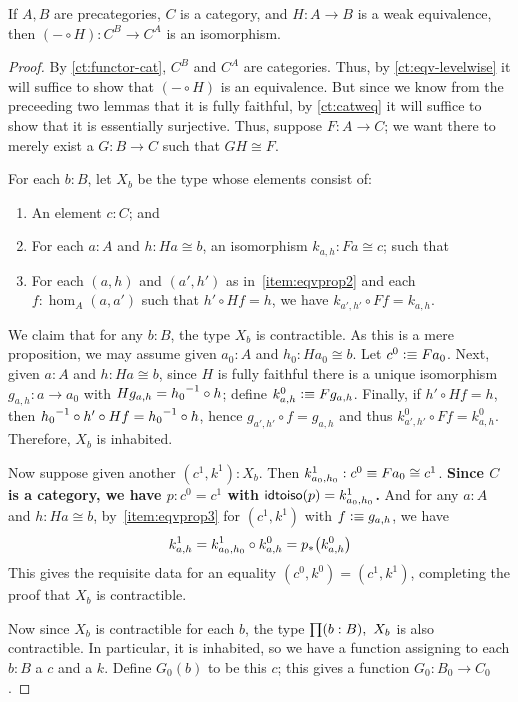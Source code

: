 \begin{thm}\label{ct:cat-weq-eq}
  If $A,B$ are precategories, $C$ is a category, and $H:A\to B$ is a weak equivalence, then $(-\circ H):C^B \to C^A$ is an isomorphism.
\end{thm}
\begin{proof}
  By \autoref{ct:functor-cat}, $C^B$ and $C^A$ are categories.
  Thus, by \autoref{ct:eqv-levelwise} it will suffice to show that $(-\circ H)$ is an equivalence.
  But since we know from the preceeding two lemmas that it is fully faithful, by \autoref{ct:catweq} it will suffice to show that it is essentially surjective.
  Thus, suppose $F:A\to C$; we want there to merely exist a $G:B\to C$ such that $GH\cong F$.

  For each $b:B$, let $X_b$ be the type whose elements consist of:
  \begin{enumerate}
  \item An element $c:C$; and
  \item For each $a:A$ and $h:Ha\cong b$, an isomorphism $k_{a,h}:Fa\cong c$; such that\label{item:eqvprop2}
  \item For each $(a,h)$ and $(a',h')$ as in~\ref{item:eqvprop2} and each $f:\hom_A(a,a')$ such that $h'\circ Hf = h$, we have $k_{a',h'}\circ Ff = k_{a,h}$.\label{item:eqvprop3}
  \end{enumerate}
  We claim that for any $b:B$, the type $X_b$ is contractible.
  As this is a mere proposition, we may assume given $a_0:A$ and $h_0:Ha_0 \cong b$.
  Let $c^0\vcentcolon\equiv Fa_0$.
  Next, given $a:A$ and $h:Ha\cong b$, since $H$ is fully faithful there is a unique isomorphism $g_{a,h}:a\to a_0$ with $Hg_{a,h} = {h_0}^{-1}\circ h$; define $k^0_{a,h} \vcentcolon\equiv Fg_{a,h}$.
  Finally, if $h'\circ Hf = h$, then ${h_0}^{-1}\circ h'\circ Hf = {h_0}^{-1}\circ h$, hence $g_{a',h'} \circ f = g_{a,h}$ and thus $k^0_{a',h'}\circ Ff = k^0_{a,h}$.
  Therefore, $X_b$ is inhabited.

  Now suppose given another $(c^1,k^1): X_b$.
  Then $k^1_{a_0,h_0}:c^0 \equiv Fa_0 \cong c^1$.
  \textbf{Since $C$ is a category, we have $p:c^0=c^1$ with $\mathsf{idtoiso}(p) = k^1_{a_0,h_0}$.}
  And for any $a:A$ and $h:Ha\cong b$, by~\ref{item:eqvprop3} for $(c^1,k^1)$ with $f\vcentcolon\equiv g_{a,h}$, we have
  \[k^1_{a,h} = k^1_{a_0,h_0} \circ k^0_{a,h} = {p}_{*}\!\left({k^0_{a,h}}\right)\]
  This gives the requisite data for an equality $(c^0,k^0)=(c^1,k^1)$, completing the proof that $X_b$ is contractible.

  Now since $X_b$ is contractible for each $b$, the type $\prd{b:B} X_b$ is also contractible.
  In particular, it is inhabited, so we have a function assigning to each $b:B$ a $c$ and a $k$.
  Define $G_0(b)$ to be this $c$; this gives a function $G_0 :B_0 \to C_0$.


\end{proof}
